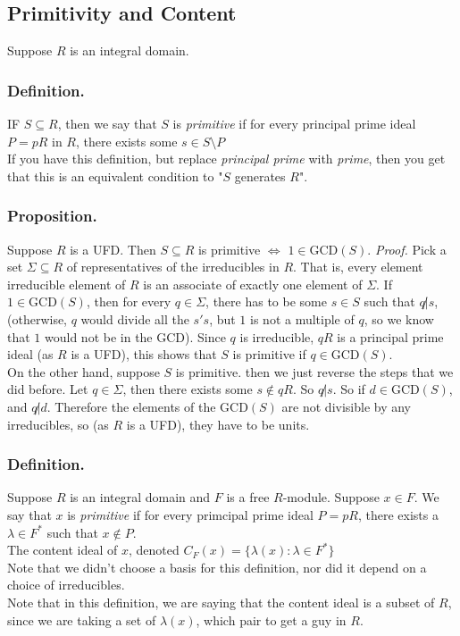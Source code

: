 \documentclass{article}
\newcommand{\vs}{\bigskip\\\text{}}
\newcommand{\beginproof}{\vspace{10pt}\newline\textit{Proof.}\hspace{1em}}
\begin{document}
\subsection{Primitivity and Content}
Suppose $R$ is an integral domain.
\subsubsection{Definition.}  IF $S \subseteq R$, then we say that $S$ is
\textit{primitive} if for every principal prime ideal $P = pR$ in $R$, there
exists some $s \in S\setminus P$\vs
If you have this definition, but replace \textit{principal prime} with
\textit{prime}, then you get that this is an equivalent condition to "$S$
generates $R$". 
\subsubsection{Proposition.} Suppose $R$ is a UFD. Then $S\subseteq R$ is primitive
$\iff$ $1 \in \text{GCD}(S)$. \beginproof
Pick a set $\Sigma \subseteq R$ of representatives of the irreducibles in $R$.
That is, every element irreducible element of $R$ is an associate of exactly one element of
$\Sigma$.
If $1 \in \text{GCD}(S)$, then for every $q \in \Sigma$, there has to be some $s\in S$
such that $q \not | s$, (otherwise, $q$ would divide all the $s's$, but $1$ is
not a multiple of $q$, so we know that $1$ would not be in the $\text{GCD}$). Since $q$
is irreducible, $qR$ is a principal prime ideal (as $R$ is a UFD), this shows
that $S$ is primitive if $q \in \text{GCD}(S)$.\vs
On the other hand, suppose $S$ is primitive. then we just reverse the steps that
we did before. Let $q \in \Sigma$, then there exists some $s\not\in qR$. So
$q\not | s$. So if $d \in \text{GCD}(S)$, and $q \not| d$. Therefore the elements of
the $\text{GCD}(S)$ are not divisible by any irreducibles, so (as $R$ is a UFD), they
have to be units.
\subsubsection{Definition.} Suppose $R$ is an integral domain and $F$ is a free
$R$-module. Suppose $x \in F$. We say that $x$ is \textit{primitive} if
for every primcipal prime ideal $P = pR$, there exists a $\lambda \in F^*$
such that $x\not \in P$. \vs
The content ideal of $x$, denoted $C_F(x) =\{\lambda(x): \lambda \in F^*\}$\vs
Note that we didn't choose a basis for this definition, nor did it depend on a
choice of irreducibles.\vs
Note that in this definition, we are saying that the content ideal is a subset
of $R$, since we are taking a set of $\lambda(x)$, which pair to get a guy in
$R$.
\end{document}
